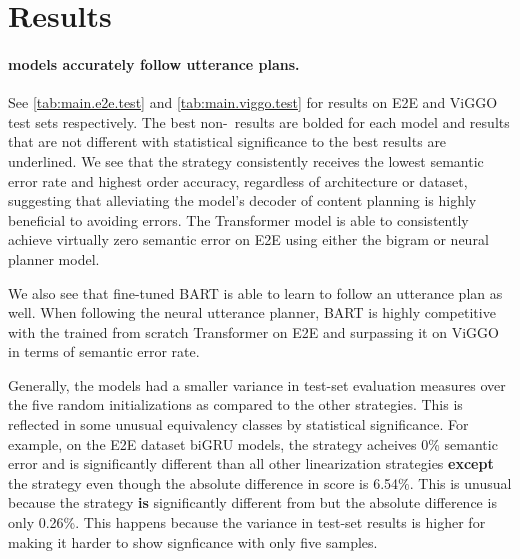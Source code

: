 \section{Results}


\paragraph{ models accurately follow utterance plans.} See
\autoref{tab:main.e2e.test} and \autoref{tab:main.viggo.test} for results on
E2E and ViGGO test sets respectively.  
The best non-\Oracle~results are bolded for each model and results
that are not different with statistical significance to the best results
are underlined.
We see that the 
strategy consistently receives the lowest semantic error rate and highest 
order accuracy, regardless of
architecture or dataset, suggesting that alleviating the model's decoder of content
planning is highly beneficial to avoiding errors. The Transformer  model is able to consistently achieve virtually zero semantic error on E2E using either
the bigram or neural planner model.

We also see that fine-tuned BART is able to learn to follow an utterance plan
as well. When following the neural utterance planner,
BART is highly competitive with the trained from scratch Transformer
on E2E and surpassing it on ViGGO in terms of semantic error rate.







    Generally, the  models had a smaller variance in test-set
evaluation measures over the five random initializations as compared to the
other strategies. This is reflected in some unusual equivalency classes
by statistical significance. For example, on the E2E dataset biGRU models,
the  strategy acheives 0\% semantic error and is significantly
different than all other linearization strategies \textbf{except} 
the  strategy even though the absolute difference in score is 
6.54\%. This is unusual because the  strategy \textbf{is} 
significantly different from  but the absolute difference is
only 0.26\%. This happens because the variance in test-set results
is higher for  making it harder to show signficance with only
five samples.



